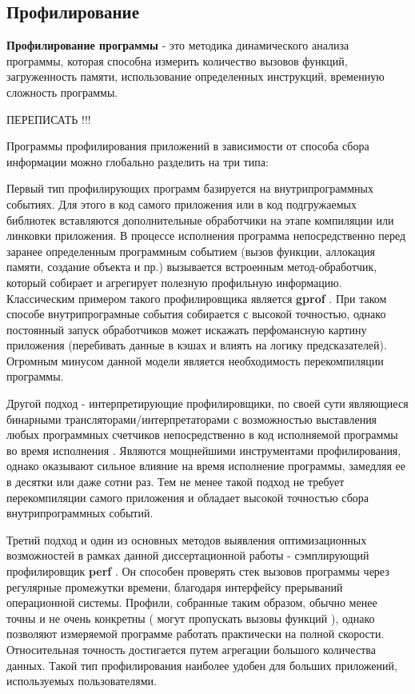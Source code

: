 \subsection {Профилирование}\label{p1:optop:profile}
\textbf{Профилирование программы}  - это методика динамического анализа программы, которая способна измерить количество вызовов функций, загруженность памяти, использование определенных инструкций,  временную сложность программы.

ПЕРЕПИСАТЬ !!!

Программы профилирования приложений в зависимости от способа сбора информации можно глобально разделить на три типа:

Первый тип профилирующих программ базируется на внутрипрограммных событиях. Для этого в код самого приложения или в код подгружаемых библиотек  вставляются дополнительные обработчики на этапе компиляции или линковки приложения. В процессе исполнения программа непосредственно перед заранее определенным программным событием (вызов функции, аллокация памяти, создание объекта и пр.) вызывается встроенным метод-обработчик, который собирает и агрегирует полезную профильную информацию. Классическим примером такого профилировщика является \textbf{gprof} \cite{graham2004gprof}. При таком способе внутрипрограмные события собирается с высокой точностью, однако постоянный запуск обработчиков может искажать перфомансную картину приложения (перебивать данные в кэшах и  влиять на логику предсказателей). Огромным минусом данной модели является необходимость перекомпиляции программы.

Другой подход - интерпретирующие профилировщики, по своей сути являющиеся бинарными трансляторами/интерпретаторами с возможностью выставления любых программных счетчиков непосредственно в код исполняемой программы во время исполнения \cite{reinders2005vtune, nethercote2007valgrind}. Являются мощнейшими инструментами профилирования, однако оказывают сильное влияние на время исполнение программы, замедляя ее в десятки или даже сотни раз. Тем не менее такой подход не требует перекомпиляции самого приложения и обладает высокой точностью сбора внутрипрограммных событий.

Третий подход и один из основных методов выявления оптимизационных возможностей в рамках данной диссертационной работы -  сэмплирующий профилировщик \textbf{perf} \cite{de2010new}.  Он способен проверять стек вызовов программы через регулярные промежутки времени, благодаря интерфейсу прерываний операционной системы. Профили, собранные таким образом, обычно менее точны и не очень конкретны ( могут пропускать вызовы функций ), однако позволяют измеряемой программе работать практически на полной скорости. Относительная точность достигается путем агрегации большого количества данных. Такой тип профилирования наиболее удобен для больших приложений, используемых пользователями.


